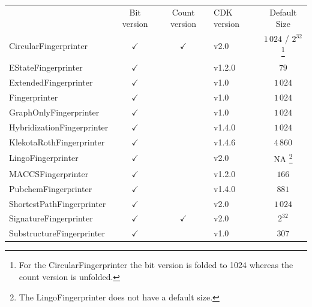 \documentclass[doublespacing]{bmcart}
\def \cdkversion {v2.0}
\begin{document}
\begin{backmatter}
    \begin{minipage}{1\textwidth}
    \renewcommand*{\thempfootnote}{\fnsymbol{mpfootnote}}
    \centering
    \begin{tabular}{lcclc}
                             & Bit version  & Count version & CDK version & Default Size    \\
  CircularFingerprinter~\cite{rogers2010extended, Clark2014}      & $\checkmark$ & $\checkmark$  & \cdkversion{}     & $1\,024$ / $2^{32}$%
\footnote[1]{For the CircularFingerprinter the bit version is folded to 1024 whereas the count version is unfolded.} \\
  EStateFingerprinter~\cite{Hall1995}       & $\checkmark$ &               & v1.2.0       & $79$            \\
  ExtendedFingerprinter      & $\checkmark$ &               & v1.0         & $1\,024$        \\
  Fingerprinter              & $\checkmark$ &               & v1.0         & $1\,024$        \\
  GraphOnlyFingerprinter     & $\checkmark$ &               & v1.0         & $1\,024$        \\
  HybridizationFingerprinter & $\checkmark$ &               & v1.4.0       & $1\,024$        \\
  KlekotaRothFingerprinter~\cite{Klekota2008}   & $\checkmark$ &               & v1.4.6       & $4\,860$        \\
  LingoFingerprinter~\cite{vidal2005lingo}         & $\checkmark$ &               & \cdkversion{}     & NA%
\footnote[2]{The LingoFingerprinter does not have a default size.}
                                                                                             \\
  MACCSFingerprinter         & $\checkmark$ &               & v1.2.0       & $166$           \\
  PubchemFingerprinter~\cite{pubchemFP}       & $\checkmark$ &               & v1.4.0       & $881$            \\
  ShortestPathFingerprinter  & $\checkmark$ &               & \cdkversion{}     & $1\,024$        \\
  SignatureFingerprinter~\cite{signaturefingerprints}     & $\checkmark$ & $\checkmark$  & \cdkversion{}     & $2^{32}$         \\
  SubstructureFingerprinter  & $\checkmark$ &               & v1.0         & $307$           \\

    \end{tabular}
    \end{minipage}


\end{backmatter}
\end{document}

